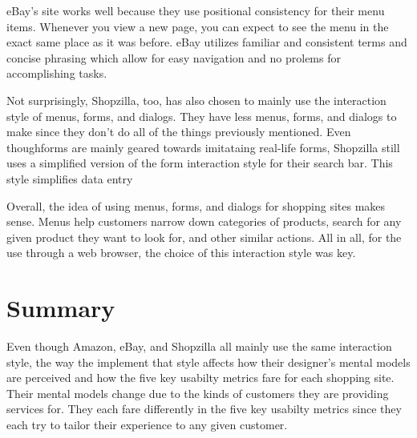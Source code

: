 \documentclass[11pt, oneside]{article}
\begin{document}
	eBay's site works well because they use positional consistency for their menu items. Whenever you view a new page, you can expect to see the menu in the exact same place as it was before. eBay utilizes familiar and consistent terms and concise phrasing which allow for easy navigation and no prolems for accomplishing tasks.

	Not surprisingly, Shopzilla, too, has also chosen to mainly use the interaction style of menus, forms, and dialogs. They have less menus, forms, and dialogs to make since they don't do all of the things previously mentioned. Even thoughforms are mainly geared towards imitataing real-life forms, Shopzilla still uses a simplified version of the form interaction style for their search bar. This style simplifies data entry

	Overall, the idea of using menus, forms, and dialogs for shopping sites makes sense. Menus help customers narrow down categories of products, search for any given product they want to look for, and other similar actions. All in all, for the use through a web browser, the choice of this interaction style was key.  

\section{Summary}

	Even though Amazon, eBay, and Shopzilla all mainly use the same interaction style, the way the implement that style affects how their designer's mental models are perceived and how the five key usabilty metrics fare for each shopping site. Their mental models change due to the kinds of customers they are providing services for. They each fare differently in the five key usabilty metrics since they each try to tailor their experience to any given customer.
\end{document}
